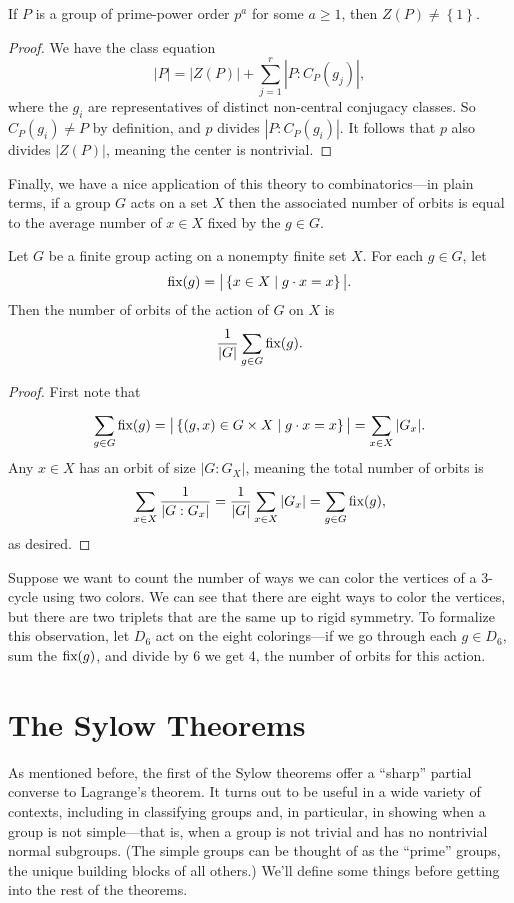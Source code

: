 \documentclass[../m171main.tex]{subfiles}
\begin{document}
\begin{theorem}[]
    If $P$ is a group of prime-power order $p^{a}$ for some $a \geq 1$, then $Z(P) \neq \left\{ 1 \right\}$.
\end{theorem}

\begin{proof}
    We have the class equation
    \[ |P| = |Z(P)| + \sum_{j=1}^{r} | P : C_P(g_j) |, \]
    where the $g_i$ are representatives of distinct non-central conjugacy classes.
    So $C_P(g_i) \neq P$ by definition, and $p$ divides $|P : C_P(g_i)|$.
    It follows that $p$ also divides $|Z(P)|$, meaning the center is nontrivial.
\end{proof}

Finally, we have a nice application of this theory to combinatorics---in plain terms, if a group $G$ acts on a set $X$ then the associated number of orbits is equal to the average number of $x \in X$ fixed by the $g \in G$.

\begin{theorem}   %
    Let $G$ be a finite group acting on a nonempty finite set $X$.
    For each $g \in G$, let
    \[ \textrm{fix}(g) = \big| \left\{ x \in X \mid g \cdot x = x \right\} \big|. \]
    Then the number of orbits of the action of $G$ on $X$ is
    \[ \frac{1}{|G|} \sum_{g \in G}^{} \textrm{fix}(g). \]
\end{theorem}

\begin{proof}
    First note that
    \[ \sum_{g \in G}^{} \textrm{fix}(g) = \big| \left\{ (g,x) \in G \times X \mid g \cdot x = x \right\} \big| = \sum_{x \in X}^{} |G_x|. \]
    Any $x \in X$ has an orbit of size $|G : G_X|$, meaning the total number of orbits is
    \[ \sum_{x \in X}^{} \frac{1}{|G : G_x|} = \frac{1}{|G|} \sum_{x \in X}^{} |G_x| = \sum_{g \in G}^{} \textrm{fix}(g), \]     %
    as desired.
\end{proof}

Suppose we want to count the number of ways we can color the vertices of a 3-cycle using two colors.
We can see that there are eight ways to color the vertices, but there are two triplets that are the same up to rigid symmetry.
To formalize this observation, let $D_6$ act on the eight colorings---if we go through each $g \in D_6$, sum the $\textrm{fix}(g)$, and divide by 6 we get 4, the number of orbits for this action.

\section{The Sylow Theorems}
As mentioned before, the first of the Sylow theorems offer a ``sharp'' partial converse to Lagrange's theorem.
It turns out to be useful in a wide variety of contexts, including in classifying groups and, in particular, in showing when a group is not simple---that is, when a group is not trivial and has no nontrivial normal subgroups.
(The simple groups can be thought of as the ``prime'' groups, the unique building blocks of all others.)
We'll define some things before getting into the rest of the theorems.
\end{document}

